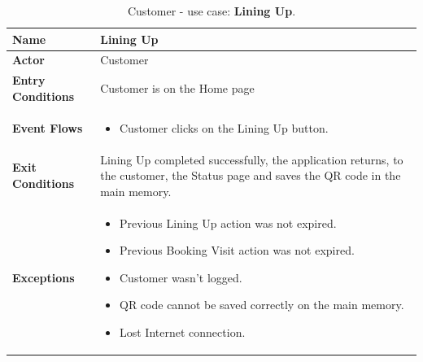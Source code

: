 \begin{table}[h!]
\centering
\begin{tabular}{| m{} | m{} |} 
	\hline
	\textbf{Name} & Lining Up \\ 
	\hline
	\textbf{Actor} & Customer \\ 
	\hline
	\textbf{Entry Conditions} & Customer is on the Home page \\ 
	\hline
	\textbf{Event Flows} &
	\begin{itemize}
	\item Customer clicks on the Lining Up button.
	\end{itemize} \\ 
	\hline
	\textbf{Exit Conditions} & Lining Up completed successfully, the application returns, to the customer, the Status page and saves the QR code in the main memory. \\ 
	\hline
	\textbf{Exceptions} &
	\begin{itemize}
	\item Previous Lining Up action was not expired.
	\item Previous Booking Visit action was not expired.
	\item Customer wasn't logged.
	\item QR code cannot be saved correctly on the main memory.
	\item Lost Internet connection.
	\end{itemize} \\ 
	\hline
\end{tabular}
\caption{Customer - use case: \textbf{Lining Up}.}
\label{tableLogIn}
\end{table}

